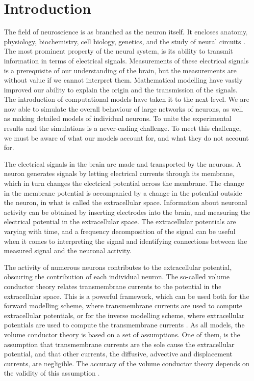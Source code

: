 \documentclass{article}
\begin{document}
\tableofcontents %
\section{Introduction}\label{Introduction}

The field of neuroscience is as branched as the neuron itself. It encloses anatomy, physiology, biochemistry, cell biology, genetics, and the study of neural circuits \cite{Neuroscience}. The most prominent property of the neural system, is its ability to transmit information in terms of electrical signals. Measurements of these electrical signals is a prerequisite of our understanding of the brain, but the measurements are without value if we cannot interpret them. Mathematical modelling have vastly improved our ability to explain the origin and the transmission of the signals. The introduction of computational models have taken it to the next level. We are now able to simulate the overall behaviour of large networks of neurons, as well as making detailed models of individual neurons. To unite the experimental results and the simulations is a never-ending challenge. To meet this challenge, we must be aware of what our models account for, and what they do not account for. 

The electrical signals in the brain are made and transported by the neurons. A neuron generates signals by letting electrical currents through its membrane, which in turn changes the electrical potential across the membrane. The change in the membrane potential is accompanied by a change in the potential outside the neuron, in what is called the extracellular space. Information about neuronal activity can be obtained by inserting electrodes into the brain, and measuring the electrical potential in the extracellular space. The extracellular potentials are varying with time, and a frequency decomposition of the signal can be useful when it comes to interpreting the signal and identifying connections between the measured signal and the neuronal activity.

The activity of numerous neurons contributes to the extracellular potential, obscuring the contribution of each individual neuron. The so-called volume conductor theory relates transmembrane currents to the potential in the extracellular space. This is a powerful framework, which can be used both for the forward modelling scheme, where transmembrane currents are used to compute extracellular potentials, or for the inverse modelling scheme, where extracellular potentials are used to compute the transmembrane currents \cite{Einevoll2013}. As all models, the volume conductor theory is based on a set of assumptions. One of them, is the assumption that transmembrane currents are the sole cause the extracellular potential, and that other currents, the diffusive, advective and displacement currents, are negligible. The accuracy of the volume conductor theory depends on the validity of this assumption \cite{Gratiy2017}.
\end{document}

